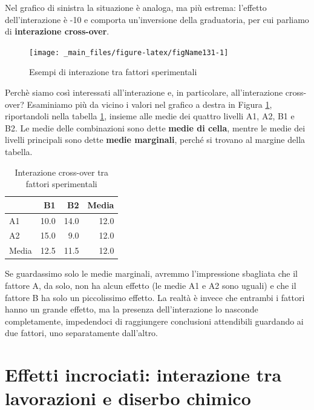 \documentclass[a4paper,12pt,oneside]{book}
\begin{document}
Nel grafico di sinistra la situazione è analoga, ma più estrema: l'effetto dell'interazione è -10 e comporta un'inversione della graduatoria, per cui parliamo di \textbf{interazione cross-over}.

\begin{figure}

{\centering \texttt{[image: \_main\_files/figure-latex/figName131-1]} 

}

\caption{Esempi di interazione tra fattori sperimentali}\label{fig:figName131}
\end{figure}

Perchè siamo così interessati all'interazione e, in particolare, all'interazione cross-over? Esaminiamo più da vicino i valori nel grafico a destra in Figura \ref{fig:figName131}, riportandoli nella tabella \ref{tab:tabName131}, insieme alle medie dei quattro livelli A1, A2, B1 e B2. Le medie delle combinazioni sono dette \textbf{medie di cella}, mentre le medie dei livelli principali sono dette \textbf{medie marginali}, perché si trovano al margine della tabella.

\begin{table}

\caption{\label{tab:tabName131}Interazione cross-over tra fattori sperimentali}
\centering
\begin{tabular}[t]{lrrr}
\toprule
  & B1 & B2 & Media\\
\midrule
A1 & 10.0 & 14.0 & 12.0\\
A2 & 15.0 & 9.0 & 12.0\\
Media & 12.5 & 11.5 & 12.0\\
\bottomrule
\end{tabular}
\end{table}

Se guardassimo solo le medie marginali, avremmo l'impressione sbagliata che il fattore A, da solo, non ha alcun effetto (le medie A1 e A2 sono uguali) e che il fattore B ha solo un piccolissimo effetto. La realtà è invece che entrambi i fattori hanno un grande effetto, ma la presenza dell'interazione lo nasconde completamente, impedendoci di raggiungere conclusioni attendibili guardando ai due fattori, uno separatamente dall'altro.

\hypertarget{effetti-incrociati-interazione-tra-lavorazioni-e-diserbo-chimico}{%
\section{Effetti incrociati: interazione tra lavorazioni e diserbo chimico}\label{effetti-incrociati-interazione-tra-lavorazioni-e-diserbo-chimico}}
\end{document}
